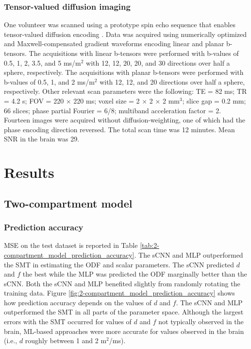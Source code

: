\documentclass[10pt, letterpaper, oneside]{article}
\begin{document}
\subsubsection{Tensor-valued diffusion imaging}

One volunteer was scanned using a prototype spin echo sequence that enables tensor-valued diffusion encoding \citep{szczepankiewicz2019tensor}. Data was acquired using numerically optimized \citep{sjolund2015constrained} and Maxwell-compensated \citep{szczepankiewicz2019maxwell} gradient waveforms encoding linear and planar b-tensors. The acquisitions with linear b-tensors were performed with b-values of 0.5, 1, 2, 3.5, and 5 ms/\textmu m$^2$ with 12, 12, 20, 20, and 30 directions over half a sphere, respectively. The acquisitions with planar b-tensors were performed with b-values of 0.5, 1, and 2 ms/\textmu m$^2$ with 12, 12, and 20 directions over half a sphere, respectively. Other relevant scan parameters were the following: TE = 82 ms; TR = 4.2 s; FOV = 220 × 220 ms; voxel size = 2 × 2 × 2 mm$^3$; slice gap = 0.2 mm; 66 slices; phase partial Fourier = 6/8; multiband acceleration factor = 2. Fourteen images were acquired without diffusion-weighting, one of which had the phase encoding direction reversed. The total scan time was 12 minutes. Mean SNR in the brain was 29.

\section{Results}

\FloatBarrier

\subsection{Two-compartment model}

\subsubsection{Prediction accuracy}

MSE on the test dataset is reported in Table \ref{tab:2-compartment_model_prediction_accuracy}. The sCNN and MLP outperformed the SMT in estimating the ODF and scalar parameters. The sCNN predicted $d$ and $f$ the best while the MLP was predicted the ODF marginally better than the sCNN. Both the sCNN and MLP benefited slightly from randomly rotating the training data. Figure \ref{fig:2-compartment_model_prediction_accuracy} shows how prediction accuracy depends on the values of $d$ and $f$. The sCNN and MLP outperformed the SMT in all parts of the parameter space. Although the largest errors with the SMT occurred for values of $d$ and $f$ not typically observed in the brain, ML-based approaches were more accurate for values observed in the brain (i.e., $d$ roughly between 1 and 2 \textmu m$^2$/ms).
\end{document}
